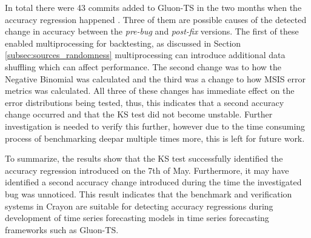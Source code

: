 In total there were 43 commits added to Gluon-TS in the two months when the accuracy regression happened \cite{gluonts-github}. Three of them are possible causes of the detected change in accuracy between the \textit{pre-bug} and \textit{post-fix} versions. The first of these enabled multiprocessing for backtesting, as discussed in Section \ref{subsec:sources_randomness} multiprocessing can introduce additional data shuffling which can affect performance. The second change was to how the Negative Binomial was calculated and the third was a change to how MSIS error metrics was calculated. All three of these changes has immediate effect on the error distributions being tested, thus, this indicates that a second accuracy change occurred and that the KS test did not become unstable. Further investigation is needed to verify this further, however due to the time consuming process of benchmarking deepar multiple times more, this is left for future work.

To summarize, the results show that the KS test successfully identified the accuracy regression introduced on the 7th of May. Furthermore, it may have identified a second accuracy change introduced during the time the investigated bug was unnoticed. This result indicates that the benchmark and verification systems in Crayon are suitable for detecting accuracy regressions during development of time series forecasting models in time series forecasting frameworks such as Gluon-TS.






